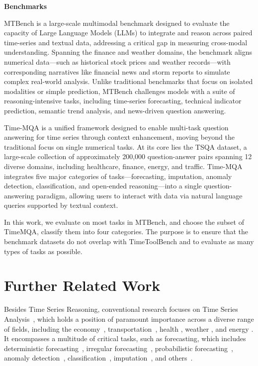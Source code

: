 \textbf{Benchmarks}

MTBench is a large-scale multimodal benchmark designed to evaluate the capacity of Large Language Models (LLMs) to integrate and reason across paired time-series and textual data, addressing a critical gap in measuring cross-modal understanding. Spanning the finance and weather domains, the benchmark aligns numerical data—such as historical stock prices and weather records—with corresponding narratives like financial news and storm reports to simulate complex real-world analysis. Unlike traditional benchmarks that focus on isolated modalities or simple prediction, MTBench challenges models with a suite of reasoning-intensive tasks, including time-series forecasting, technical indicator prediction, semantic trend analysis, and news-driven question answering. 

Time-MQA is a unified framework designed to enable multi-task question answering for time series through context enhancement, moving beyond the traditional focus on single numerical tasks. At its core lies the TSQA dataset, a large-scale collection of approximately 200,000 question-answer pairs spanning 12 diverse domains, including healthcare, finance, energy, and traffic. Time-MQA integrates five major categories of tasks—forecasting, imputation, anomaly detection, classification, and open-ended reasoning—into a single question-answering paradigm, allowing users to interact with data via natural language queries supported by textual context. 

In this work, we evaluate on most tasks in MTBench, and choose the subset of TimeMQA, classify them into four categories. The purpose is to ensure that the benchmark datasets do not overlap with TimeToolBench and to evaluate as many types of tasks as possible.

\section{Further Related Work}
Besides Time Series Reasoning, conventional research focuses on Time Series Analysis~\citep{wu2025unlocking,qiu2025comprehensive}, which holds a position of paramount importance across a diverse range of fields, including the economy~\citep{qiu2025easytime,qiu2025multi}, transportation~\citep{wu2024fully}, health \citep{lu2023tf,lu2024mace,lu2025towards}, weather \citep{li2025set,yang2024wcdt,zhou2025reagent}, and energy \citep{sun2025hierarchical}. It encompasses a multitude of critical tasks, such as forecasting, which includes deterministic forecasting~\citep{wu2025srsnet,qiu2025duet,qiu2025dag}, irregular forecasting~\citep{liu2026apn,liu2025astgi}, probabilistic forecasting~\citep{wu2025k2vae,wu2025aurora}, anomaly detection~\citep{zhang2025encode,qiu2025tab,wu2024catch}, classification~\citep{liu2023itransformer,AimTS}, imputation~\citep{wu2022timesnet,gao2025ssdts}, and others~\citep{qiu2025DBLoss,AutoCTS++}. 


